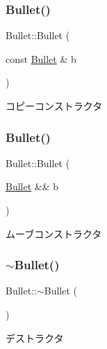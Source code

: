 \subsubsection{\texorpdfstring{Bullet()}{Bullet()}\hspace{0.1cm}{\footnotesize\ttfamily [2/3]}}
{\footnotesize\ttfamily Bullet\+::\+Bullet (\begin{DoxyParamCaption}\item[{const \mbox{\hyperlink{class_bullet}{Bullet}} \&}]{b }\end{DoxyParamCaption})\hspace{0.3cm}{\ttfamily [inline]}}



コピーコンストラクタ 

\mbox{\label{class_bullet_a4bf8f227cde57a6abcdd268df2ef9a9d}} 
\subsubsection{\texorpdfstring{Bullet()}{Bullet()}\hspace{0.1cm}{\footnotesize\ttfamily [3/3]}}
{\footnotesize\ttfamily Bullet\+::\+Bullet (\begin{DoxyParamCaption}\item[{\mbox{\hyperlink{class_bullet}{Bullet}} \&\&}]{b }\end{DoxyParamCaption})\hspace{0.3cm}{\ttfamily [inline]}}



ムーブコンストラクタ 

\mbox{\label{class_bullet_aaeb5cb41d7db89f49007b08b41f1bfcf}} 
\subsubsection{\texorpdfstring{$\sim$\+Bullet()}{~Bullet()}}
{\footnotesize\ttfamily Bullet\+::$\sim$\+Bullet (\begin{DoxyParamCaption}{ }\end{DoxyParamCaption})\hspace{0.3cm}{\ttfamily [inline]}}



デストラクタ 



